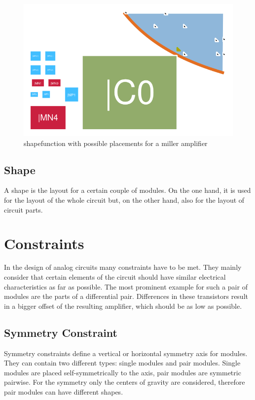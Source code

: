 \begin{figure}
	\centering
	\includegraphics[scale=1.8]{FIG/shapefunction.png}
	\caption{shapefunction with possible placements for a miller amplifier}
	\label{fig:shapefunction}
\end{figure}

\subsection{Shape}
A shape is the layout for a certain couple of modules. On the one hand, it is used for the layout of the whole circuit but, on the other hand, also for the layout of circuit parts.

\section{Constraints}
In the design of analog circuits many constraints have to be met. They mainly consider that certain elements of the circuit should have similar electrical characteristics as far as possible. The most prominent example for such a pair of modules are the parts of a differential pair. Differences in these transistors result in a bigger offset of the resulting amplifier, which should be as low as possible.

\subsection{Symmetry Constraint}
\label{subsec:symmetry_constraint}
Symmetry constraints define a vertical or horizontal symmetry axis for modules. They can contain two different types: single modules and pair modules. Single modules are placed self-symmetrically to the axis, pair modules are symmetric pairwise. For the symmetry only the centers of gravity are considered, therefore pair modules can have different shapes. 

